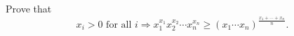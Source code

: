 Prove that
\[ x_i > 0 \text{ for all } i \Rightarrow x_1^{x_1}x_2^{x_2} \cdots x_n^{x_n} \geq (x_1 \cdots x_n)^{\frac{x_1 + \cdots + x_n}{n}}. \]

